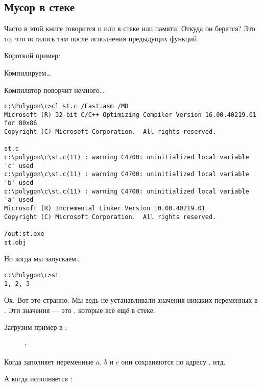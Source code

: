 \subsection{Мусор в стеке}

Часто в этой книге говорится о  или  в стеке или памяти.
Откуда он берется?
Это то, что осталось там после исполнения предыдущих функций.

Короткий пример:



Компилируем\dots



Компилятор поворчит немного\dots

\begin{lstlisting}
c:\Polygon\c>cl st.c /Fast.asm /MD
Microsoft (R) 32-bit C/C++ Optimizing Compiler Version 16.00.40219.01 for 80x86
Copyright (C) Microsoft Corporation.  All rights reserved.

st.c
c:\polygon\c\st.c(11) : warning C4700: uninitialized local variable 'c' used
c:\polygon\c\st.c(11) : warning C4700: uninitialized local variable 'b' used
c:\polygon\c\st.c(11) : warning C4700: uninitialized local variable 'a' used
Microsoft (R) Incremental Linker Version 10.00.40219.01
Copyright (C) Microsoft Corporation.  All rights reserved.

/out:st.exe
st.obj
\end{lstlisting}

Но когда мы запускаем\dots

\begin{lstlisting}
c:\Polygon\c>st
1, 2, 3
\end{lstlisting}

Ох. Вот это странно. Мы ведь не устанавливали значения никаких переменных в . 
Эти значения --- это , которые всё ещё в стеке.

\clearpage
Загрузим пример в \olly:

\begin{figure}[H]
\centering
{}
\caption{\olly: }
\label{fig:stack_noise_olly1}
\end{figure}

Когда  заполняет переменные $a$, $b$ и $c$ они сохраняются по адресу , итд.

\clearpage
А когда исполняется :

